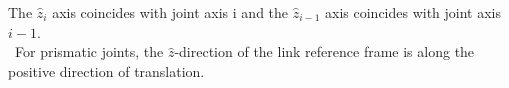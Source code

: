 \documentclass[preview]{standalone}
\begin{document}
\begin{center}
The $\hat{z}_i$ axis coincides with joint axis i and the $\hat{z}_{i-1}$ axis coincides with joint axis $i-1$.\\\
                For prismatic joints, the $\hat{z}$-direction of the link reference frame is along the positive direction of translation.
\end{center}
\end{document}
